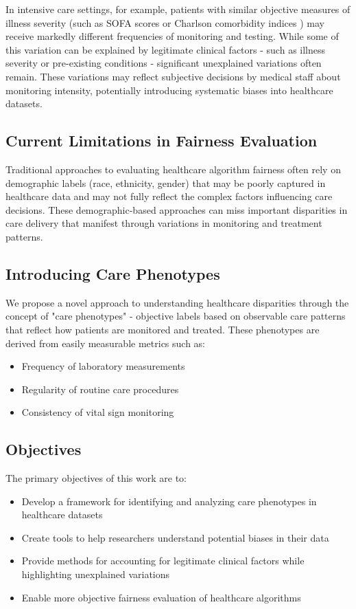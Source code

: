 \documentclass[12pt]{article}
\begin{document}
In intensive care settings, for example, patients with similar objective measures of illness severity (such as SOFA scores \citep{sofa1996} or Charlson comorbidity indices \citep{charlson1987}) may receive markedly different frequencies of monitoring and testing. While some of this variation can be explained by legitimate clinical factors - such as illness severity or pre-existing conditions - significant unexplained variations often remain. These variations may reflect subjective decisions by medical staff about monitoring intensity, potentially introducing systematic biases into healthcare datasets.

\subsection{Current Limitations in Fairness Evaluation}

Traditional approaches to evaluating healthcare algorithm fairness often rely on demographic labels (race, ethnicity, gender) that may be poorly captured in healthcare data and may not fully reflect the complex factors influencing care decisions. These demographic-based approaches can miss important disparities in care delivery that manifest through variations in monitoring and treatment patterns.

\subsection{Introducing Care Phenotypes}

We propose a novel approach to understanding healthcare disparities through the concept of "care phenotypes" - objective labels based on observable care patterns that reflect how patients are monitored and treated. These phenotypes are derived from easily measurable metrics such as:
\begin{itemize}
    \item Frequency of laboratory measurements
    \item Regularity of routine care procedures
    \item Consistency of vital sign monitoring
\end{itemize}

\subsection{Objectives}

The primary objectives of this work are to:
\begin{itemize}
    \item Develop a framework for identifying and analyzing care phenotypes in healthcare datasets
    \item Create tools to help researchers understand potential biases in their data
    \item Provide methods for accounting for legitimate clinical factors while highlighting unexplained variations
    \item Enable more objective fairness evaluation of healthcare algorithms
\end{itemize}
\end{document}
